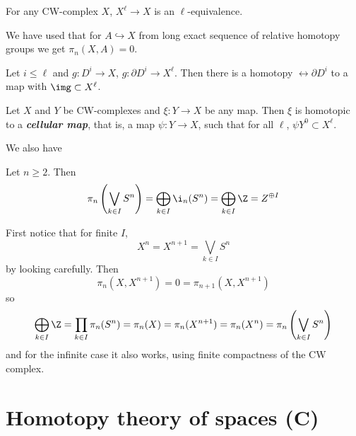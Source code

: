 \begin{remark}
\begin{prop}
	For any CW-complex $X$, $X^\ell\to X$ is an $\ell$-equivalence.
\end{prop}

\begin{remark}
	We have used that for $A\hookrightarrow X$ from long exact sequence of relative homotopy groups we get $\pi_n(X,A)=0$.
\end{remark}

\begin{coro}
	Let $i\leq \ell$ and $g: D^i\to X$, $g:\partial D^i\to X^\ell$. Then there is a homotopy $\rel\partial D^i$ to a map with $\img\subset X^\ell$.
\end{coro}

\begin{thm}
	Let $X$ and $Y$ be CW-complexes and $\xi:Y\to X$ be any map. Then $\xi$ is homotopic to a \textbf{\textit{cellular map}}, that is, a map $\psi:Y\to X$, such that for all $\ell$, $\psi Y^0\subset X^\ell$.
\end{thm}

We also have
\begin{prop}
	Let $n\geq 2$. Then 
	\[\pi_n\left(\bigvee_{k\in I}S^n\right)=\bigoplus_{k\in I}\i_n(S^n)=\bigoplus_{k\in I}\Z=Z^{\oplus I}\]
\end{prop}
\begin{prop}
	First notice that for finite $I$,
	\[X^n=X^{n+1}=\bigvee_{k\in I}S^n\]
	by looking carefully. Then
	\[\pi_n(X,X^{n+1})=0=\pi_{n+1}(X,X^{n+1})\]
	so
	\[\bigoplus_{k\in I}\Z=\prod_{k\in I}\pi_n(S^n)=\pi_n(X)=\pi_n(X^{n+1})=\pi_n(X^n)=\pi_n\left(\bigvee_{k\in I}S^n\right)\]
	and for the infinite case it also works, using finite compactness of the CW complex.
\end{prop}

\section{Homotopy theory of spaces (C)}


\end{remark}
